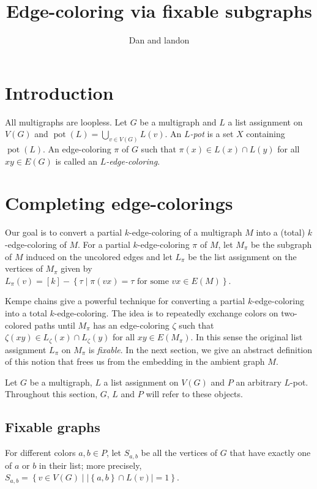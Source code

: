 \documentclass[12pt]{article}
\theoremstyle{plain}
\theoremstyle{definition}
\theoremstyle{remark}
\newcommand{\set}[1]{\left\{ #1 \right\}}
\newcommand{\setb}[3]{\left\{ #1 \in #2 \mid #3 \right\}}
\newcommand{\setbs}[2]{\left\{ #1 \mid #2 \right\}}
\newcommand{\card}[1]{\left|#1\right|}
\newcommand{\irange}[1]{\left[#1\right]}
\newcommand{\pot}{\operatorname{pot}}
\begin{document}
\title{Edge-coloring via fixable subgraphs}
\author{Dan and landon}
\maketitle

\section{Introduction}
All multigraphs are loopless.  Let $G$ be a multigraph and $L$ a list assignment on $V(G)$ and $\pot(L) = \bigcup_{v\in V(G)} L(v)$. An \emph{$L$-pot} is a set $X$ containing $\pot(L)$. 
An edge-coloring $\pi$ of $G$ such that $\pi(x) \in L(x) \cap L(y)$ for all $xy \in E(G)$ is called an \emph{$L$-edge-coloring}.

\section{Completing edge-colorings}
Our goal is to convert a partial $k$-edge-coloring of a multigraph $M$ into a (total) $k$-edge-coloring of $M$.  For a partial $k$-edge-coloring $\pi$ of $M$, let $M_\pi$ be the subgraph of $M$ induced on the uncolored edges and let $L_\pi$ be the list assignment on the vertices of $M_\pi$ given by 
$L_\pi(v) = \irange{k} - \setbs{\tau}{\pi(vx) = \tau \text{ for some  } vx \in E(M)}$. 

Kempe chains give a powerful technique for converting a partial $k$-edge-coloring into a total $k$-edge-coloring.  The idea is to repeatedly exchange colors on two-colored paths until $M_\pi$ has an edge-coloring $\zeta$ such that $\zeta(xy) \in L_\zeta(x) \cap L_\zeta(y)$ for all $xy \in E(M_\pi)$.  In this sense the original list assignment $L_\pi$ on $M_\pi$ is \emph{fixable}. In the next section, we give an abstract definition of this notion that frees us from the embedding in the ambient graph $M$.

Let $G$ be a multigraph, $L$ a list assignment on $V(G)$ and $P$ an arbitrary $L$-pot.  Throughout this section, $G$, $L$ and $P$ will refer to these objects.

\subsection{Fixable graphs}
For different colors $a,b \in P$, let $S_{a,b}$ be all the vertices of $G$ that have exactly one of $a$ or $b$ in their list; more precisely, $S_{a,b} = \setb{v}{V(G)}{\card{\set{a,b} \cap L(v)} = 1}$.  
\end{document}
